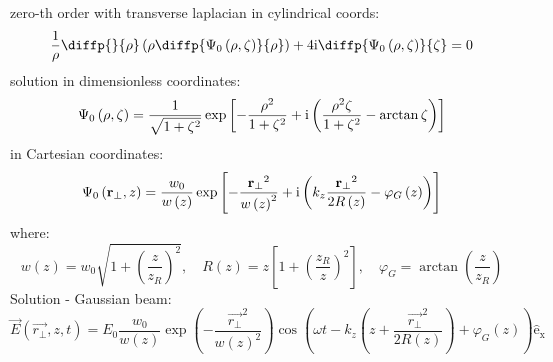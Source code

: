 zero-th order with transverse laplacian in cylindrical coords:
\begin{equation}
\frac{1}{\rho} \diffp{}{\rho}\left(\rho \diffp{\Psi_0 \left(\rho, \zeta \right)}{\rho} \right) + 4 \i \diffp{\Psi_0\left(\rho, \zeta \right)}{\zeta} = 0
\end{equation}
solution in dimensionless coordinates:
\begin{equation}
\Psi_0 \left(\rho, \zeta \right) = \frac{1}{\sqrt{1 + \zeta^2}} \exp{\left[- \frac{\rho^2}{1 + \zeta^2} + \mathrm{i}\left(\frac{\rho^2 \zeta}{1 + \zeta^2} - \arctan{\zeta} \right) \right]} 
\end{equation}
in Cartesian coordinates:
\begin{equation}
\Psi_0 \left(\mathbf{r_\bot}, z \right) = \frac{w_0}{w\left(z\right)} \exp{\left[- \frac{\mathbf{r_\bot}^2}{w\left(z \right)^2} + \mathrm{i}\left( k_z \frac{\mathbf{r_\bot}^2}{2 R\left(z \right)} - \varphi_G \left( z\right) \right) \right]}
\end{equation}
where:
\begin{equation}
w\left(z\right) = w_0 \sqrt{1 + \left(\frac{z}{z_R}\right)^2}, \quad R\left(z \right) = z \left[1 + \left(\frac{z_R}{z} \right)^2\right], \quad \varphi_G = \arctan{\left(\frac{z}{z_R}\right)}
\end{equation}
Solution - Gaussian beam:
\begin{equation}
\vec{E}\left(\vec{r_\bot}, z, t \right) = E_0 \frac{w_0}{w(z)} \exp\left(-\frac{\vec{r_\bot}^2}{w(z)^2}\right) \cos\left(\omega t - k_z \left(z + \frac{\vec{r_\bot}^2}{2 R(z)} \right) + \varphi_G(z) \right) \mathrm{\hat{e}_x}
\end{equation}